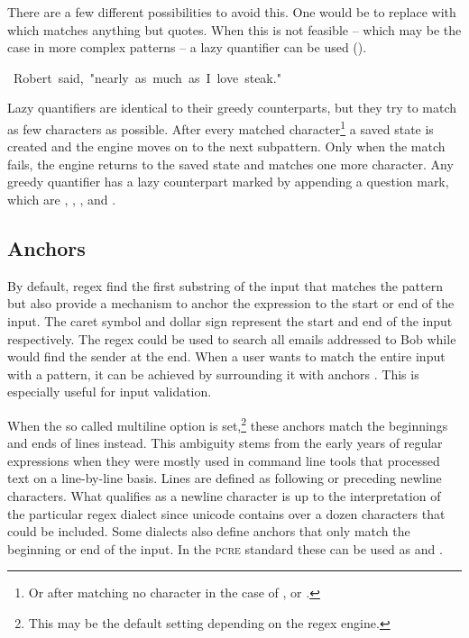 There are a few different possibilities to avoid this. One would be to replace  with \pattern{[\caret "]} which matches anything but quotes. When this is not feasible -- which may be the case in more complex patterns -- a lazy quantifier  can be used (). 


\begin{listingBoxFigure}[title={Correct use of lazy quantifier in \pattern{".*?"}},label=fig:regexSurroundingCorrectLazy,width=12cm,center]
    \hspace{-5mm}~Robert~said,~"nearly~as~much~as~I~love~steak."
\end{listingBoxFigure}

Lazy quantifiers are identical to their greedy counterparts, but they try to match as few characters as possible. After every matched character\footnote{Or after matching no character in the case of ,  or .} a saved state is created and the engine moves on to the next subpattern. Only when the match fails, the engine returns to the saved state and matches one more character. Any greedy quantifier has a lazy counterpart marked by appending a question mark, which are , , ,  and .

\subsection{Anchors} \label{sec:introAnchors}

By default, regex find the first substring of the input that matches the pattern but also provide a mechanism to anchor the expression to the start or end of the input. The caret symbol \pattern{\caret} and dollar sign \pattern{\dollar} represent the start and end of the input respectively. The regex  could be used to search all emails addressed to Bob while  would find the sender at the end. When a user wants to match the entire input with a pattern, it can be achieved by surrounding it with anchors \pattern{\caret\placeholder\dollar}. This is especially useful for input validation.

When the so called multiline option is set,\footnote{This may be the default setting depending on the regex engine.} these anchors match the beginnings and ends of lines instead. This ambiguity stems from the early years of regular expressions when they were mostly used in command line tools that processed text on a line-by-line basis. Lines are defined as following or preceding newline characters. What qualifies as a newline character is up to the interpretation of the particular regex dialect since unicode contains over a dozen characters that could be included. Some dialects also define anchors that only match the beginning or end of the input. In the \textsc{pcre} standard these can be used as  and .

